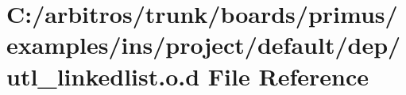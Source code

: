 \hypertarget{ins_2project_2default_2dep_2utl__linkedlist_8o_8d}{\section{C\-:/arbitros/trunk/boards/primus/examples/ins/project/default/dep/utl\-\_\-linkedlist.o.\-d File Reference}
\label{ins_2project_2default_2dep_2utl__linkedlist_8o_8d}
}
